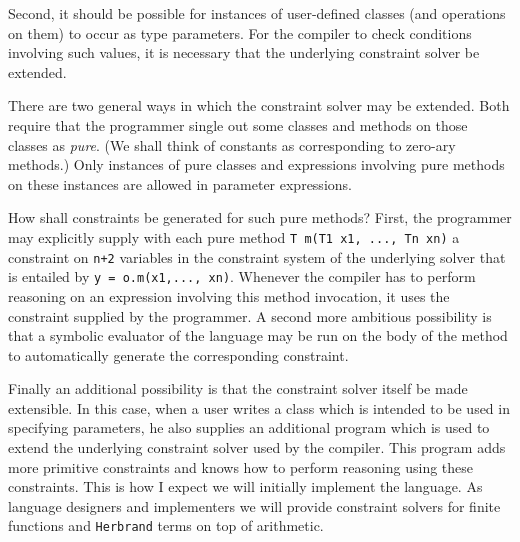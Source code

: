 Second, it should be possible for instances of user-defined classes
(and operations on them) to occur as type parameters. For the compiler
to check conditions involving such values, it is necessary that the
underlying constraint solver be extended.

There are two general ways in which the constraint solver may be
extended.  Both require that the programmer single out some classes
and methods on those classes as {\em pure}. (We shall think of
constants as corresponding to zero-ary methods.) Only instances of
pure classes and expressions involving pure methods on these instances
are allowed in parameter expressions.

How shall constraints be generated for such pure methods? First, the
programmer may explicitly supply with each pure method {\tt T m(T1 x1,
..., Tn xn)} a constraint on {\tt n+2} variables in the constraint
system of the underlying solver that is entailed by {\tt y =
o.m(x1,..., xn)}. Whenever the compiler has to perform reasoning on an
expression involving this method invocation, it uses the constraint
supplied by the programmer. A second more ambitious possibility is
that a symbolic evaluator of the language may be run on the body of
the method to automatically generate the corresponding constraint.

Finally an additional possibility is that the constraint solver itself
be made extensible. In this case, when a user writes a class which is
intended to be used in specifying parameters, he also supplies an
additional program which is used to extend the underlying constraint
solver used by the compiler. This program adds more primitive
constraints and knows how to perform reasoning using these
constraints. This is how I expect we will initially implement the
\Xten{} language. As language designers and implementers we will
provide constraint solvers for finite functions and {\tt Herbrand}
terms on top of arithmetic.



